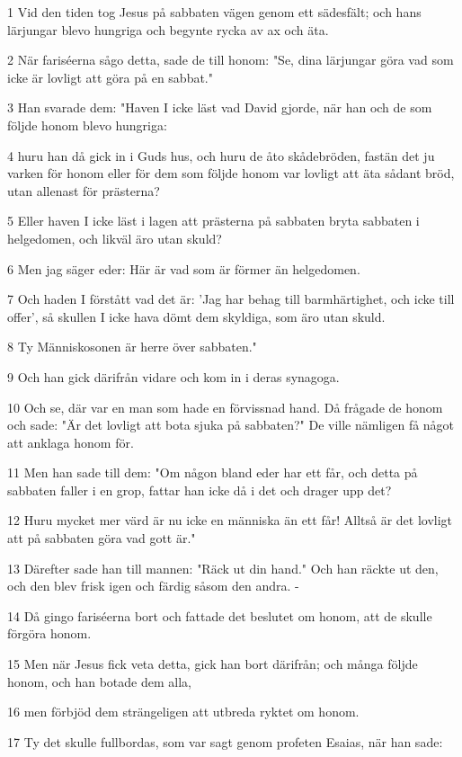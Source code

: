 \par 1 Vid den tiden tog Jesus på sabbaten vägen genom ett sädesfält; och hans lärjungar blevo hungriga och begynte rycka av ax och äta.
\par 2 När fariséerna sågo detta, sade de till honom: "Se, dina lärjungar göra vad som icke är lovligt att göra på en sabbat."
\par 3 Han svarade dem: "Haven I icke läst vad David gjorde, när han och de som följde honom blevo hungriga:
\par 4 huru han då gick in i Guds hus, och huru de åto skådebröden, fastän det ju varken för honom eller för dem som följde honom var lovligt att äta sådant bröd, utan allenast för prästerna?
\par 5 Eller haven I icke läst i lagen att prästerna på sabbaten bryta sabbaten i helgedomen, och likväl äro utan skuld?
\par 6 Men jag säger eder: Här är vad som är förmer än helgedomen.
\par 7 Och haden I förstått vad det är: 'Jag har behag till barmhärtighet, och icke till offer', så skullen I icke hava dömt dem skyldiga, som äro utan skuld.
\par 8 Ty Människosonen är herre över sabbaten."
\par 9 Och han gick därifrån vidare och kom in i deras synagoga.
\par 10 Och se, där var en man som hade en förvissnad hand. Då frågade de honom och sade: "Är det lovligt att bota sjuka på sabbaten?" De ville nämligen få något att anklaga honom för.
\par 11 Men han sade till dem: "Om någon bland eder har ett får, och detta på sabbaten faller i en grop, fattar han icke då i det och drager upp det?
\par 12 Huru mycket mer värd är nu icke en människa än ett får! Alltså är det lovligt att på sabbaten göra vad gott är."
\par 13 Därefter sade han till mannen: "Räck ut din hand." Och han räckte ut den, och den blev frisk igen och färdig såsom den andra. -
\par 14 Då gingo fariséerna bort och fattade det beslutet om honom, att de skulle förgöra honom.
\par 15 Men när Jesus fick veta detta, gick han bort därifrån; och många följde honom, och han botade dem alla,
\par 16 men förbjöd dem strängeligen att utbreda ryktet om honom.
\par 17 Ty det skulle fullbordas, som var sagt genom profeten Esaias, när han sade:
